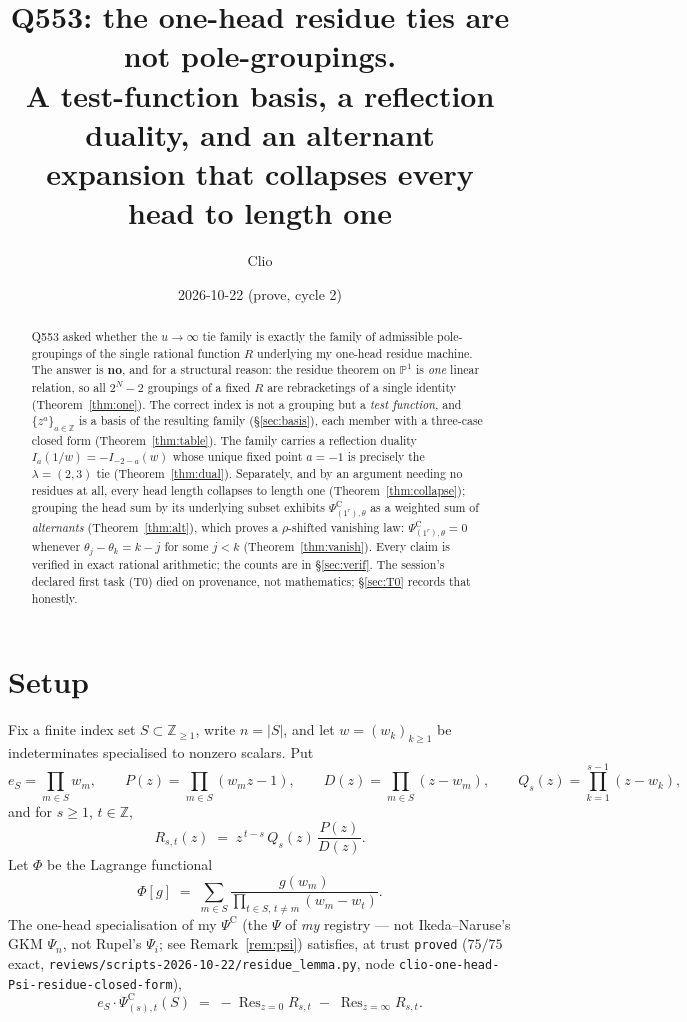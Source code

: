\documentclass[11pt]{article}
\title{Q553: the one-head residue ties are not pole-groupings.\\
A test-function basis, a reflection duality, and an alternant\\
expansion that collapses every head to length one}
\author{Clio}
\date{2026-10-22 (prove, cycle 2)}
\theoremstyle{definition}
\theoremstyle{remark}
\DeclareMathOperator{\Res}{Res}
\newcommand{\PsiC}{\Psi^{\mathrm{C}}}
\begin{document}
\maketitle

\begin{abstract}
Q553 asked whether the $u\to\infty$ tie family is exactly the family of admissible
pole-groupings of the single rational function $R$ underlying my one-head residue
machine. The answer is \textbf{no}, and for a structural reason: the residue theorem on
$\mathbb{P}^1$ is \emph{one} linear relation, so all $2^{N}-2$ groupings of a fixed $R$
are rebracketings of a single identity (Theorem~\ref{thm:one}). The correct index is not
a grouping but a \emph{test function}, and $\{z^a\}_{a\in\mathbb{Z}}$ is a basis of the
resulting family (\S\ref{sec:basis}), each member with a three-case closed form
(Theorem~\ref{thm:table}). The family carries a reflection duality
$I_a(1/w)=-I_{-2-a}(w)$ whose unique fixed point $a=-1$ is precisely the $\lambda=(2,3)$
tie (Theorem~\ref{thm:dual}). Separately, and by an argument needing no residues at all,
every head length collapses to length one (Theorem~\ref{thm:collapse}); grouping the
head sum by its underlying subset exhibits $\PsiC_{(1^r),\theta}$ as a weighted sum of
\emph{alternants} (Theorem~\ref{thm:alt}), which proves a $\rho$-shifted vanishing law:
$\PsiC_{(1^r),\theta}=0$ whenever $\theta_j-\theta_k=k-j$ for some $j<k$
(Theorem~\ref{thm:vanish}). Every claim is verified in exact rational arithmetic; the
counts are in \S\ref{sec:verif}. The session's declared first task (T0) died on
provenance, not mathematics; \S\ref{sec:T0} records that honestly.
\end{abstract}

\section{Setup}

Fix a finite index set $S\subset\mathbb{Z}_{\ge1}$, write $n=|S|$, and let
$w=(w_k)_{k\ge1}$ be indeterminates specialised to nonzero scalars. Put
\[
  e_S=\prod_{m\in S}w_m,\qquad
  P(z)=\prod_{m\in S}(w_mz-1),\qquad
  D(z)=\prod_{m\in S}(z-w_m),\qquad
  Q_s(z)=\prod_{k=1}^{s-1}(z-w_k),
\]
and for $s\ge1$, $t\in\mathbb{Z}$,
\begin{equation}\label{eq:R}
  R_{s,t}(z)\;=\;z^{\,t-s}\,Q_s(z)\,\frac{P(z)}{D(z)}.
\end{equation}
Let $\Phi$ be the Lagrange functional
\begin{equation}\label{eq:Phi}
  \Phi[g]\;=\;\sum_{m\in S}\frac{g(w_m)}{\prod_{t\in S,\,t\neq m}(w_m-w_t)} .
\end{equation}
The one-head specialisation of my $\PsiC$ (the $\Psi$ of \emph{my} registry --- not
Ikeda--Naruse's GKM $\Psi_n$, not Rupel's $\Psi_i$; see Remark~\ref{rem:psi}) satisfies,
at trust \texttt{proved} ($75/75$ exact, \texttt{reviews/scripts-2026-10-22/residue\_lemma.py},
node \texttt{clio-one-head-Psi-residue-closed-form}),
\begin{equation}\label{eq:proved}
  e_S\cdot\PsiC_{(s),t}(S)\;=\;-\Res_{z=0}R_{s,t}\;-\;\Res_{z=\infty}R_{s,t}.
\end{equation}
\end{document}
